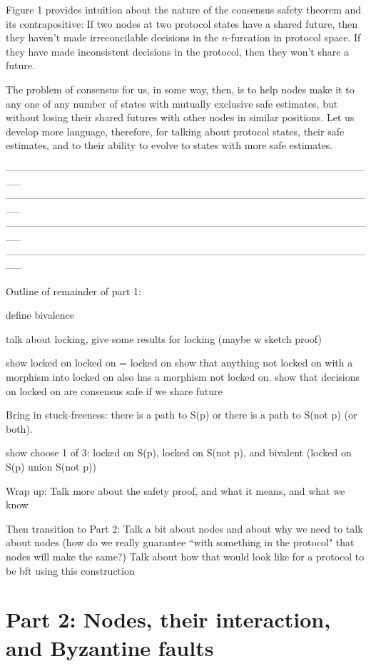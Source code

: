 \documentclass{article}
\theoremstyle{definition}
\begin{document}
Figure 1 provides intuition about the nature of the consensus safety theorem and its contrapositive: If two nodes at two protocol states have a shared future, then they haven't made irreconcilable decisions in the $n$-furcation in protocol space. If they have made inconsistent decisions in the protocol, then they won't share a future.

The problem of consensus for us, in some way, then, is to help nodes make it to any one of any number of states with mutually exclusive safe estimates, but without losing their shared futures with other nodes in similar positions. Let us develop more language, therefore, for talking about protocol states, their safe estimates, and to their ability to evolve to states with more safe estimates.



-----------------------------------------------------------------------------------------------------------------
-----------------------------------------------------------------------------------------------------------------
-----------------------------------------------------------------------------------------------------------------
-----------------------------------------------------------------------------------------------------------------


Outline of remainder of part 1:

define bivalence 

talk about locking, give some results for locking (maybe w sketch proof)

show locked on locked on = locked on
show that anything not locked on with a morphism into locked on also has a morphism not locked on.
show that decisions on locked on are consensus safe if we share future

Bring in stuck-freeness:
  there is a path to S(p) or there is a path to S(not p) (or both).

show choose 1 of 3: locked on S(p), locked on S(not p), and bivalent (locked on S(p) union S(not p))

Wrap up:
Talk more about the safety proof, and what it means, and what we know

Then transition to Part 2:
Talk a bit about nodes and about why we need to talk about nodes (how do we really guarantee ``with something in the protocol" that nodes will make the same?)
Talk about how that would look like for a protocol to be bft using this construction


\section{Part 2: Nodes, their interaction, and Byzantine faults}
\end{document}
